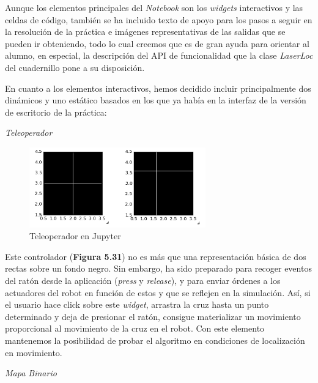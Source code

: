 Aunque los elementos principales del \textit{Notebook} son los \textit{widgets} interactivos y las celdas de código, también se ha incluido texto de apoyo para los pasos a seguir en la resolución de la práctica e imágenes representativas de las salidas que se pueden ir obteniendo, todo lo cual creemos que es de gran ayuda para orientar al alumno, en especial, la descripción del API de funcionalidad que la clase \textit{LaserLoc} del cuadernillo pone a su disposición.

En cuanto a los elementos interactivos, hemos decidido incluir principalmente dos dinámicos y uno estático basados en los que ya había en la interfaz de la versión de escritorio de la práctica:

\textit{Teleoperador}

\begin{figure}[H]
	\begin{center}
		\includegraphics[width=0.68\textwidth]{figures/teleoperadorjupyter.png}
		\caption{Teleoperador en Jupyter}
		\label{fig.laserlocjupyter}
		\end{center}
\end{figure}
Este controlador (\textbf{Figura 5.31}) no es más que una representación básica de dos rectas sobre un fondo negro. Sin embargo, ha sido preparado para recoger eventos del ratón desde la aplicación (\textit{press} y \textit{release}), y para enviar órdenes a los actuadores del robot en función de estos y que se reflejen en la simulación. Así, si el usuario hace click sobre este \textit{widget}, arrastra la cruz hasta un punto determinado y deja de presionar el ratón, consigue materializar un movimiento proporcional al movimiento de la cruz en el robot. Con este elemento mantenemos la posibilidad de probar el algoritmo en condiciones de localización en movimiento.

\textit{Mapa Binario}

